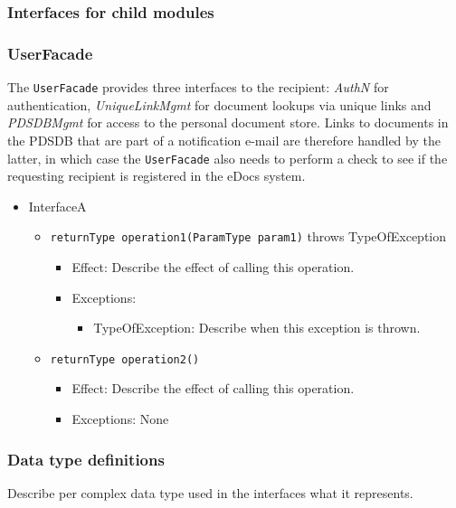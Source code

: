 \documentclass[a4paper,10pt]{article}
\begin{document}
\subsubsection{Interfaces for child modules}

\subsubsection*{UserFacade}
The \texttt{UserFacade} provides three interfaces to the recipient: \textit{AuthN} for authentication, \textit{UniqueLinkMgmt} for document lookups via unique links and \textit{PDSDBMgmt} for access to the personal document store. Links to documents in the PDSDB that are part of a notification e-mail are therefore handled by the latter, in which case the \texttt{UserFacade} also needs to perform a check to see if the requesting recipient is registered in the eDocs system.
\begin{itemize}
    \item InterfaceA
    \begin{itemize}
        \item \texttt{returnType operation1(ParamType param1)} throws TypeOfException
        \begin{itemize}
            \item Effect: Describe the effect of calling this operation.
            \item Exceptions: 
            \begin{itemize}
                \item TypeOfException: Describe when this exception is thrown.
            \end{itemize}
        \end{itemize}

        \item \texttt{returnType operation2()}
        \begin{itemize}
            \item Effect: Describe the effect of calling this operation.
            \item Exceptions: None
         \end{itemize}
    \end{itemize}
\end{itemize}

\subsubsection{Data type definitions}
Describe per complex data type used in the interfaces what it represents.
\end{document}
